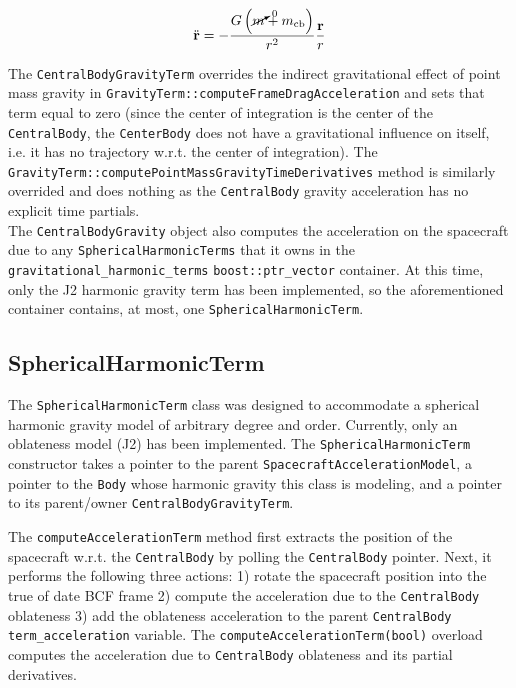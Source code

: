 \begin{equation}
\ddot{\mathbf{r}} = -\frac{G \left(\cancelto{0}{m} + m_{\text{cb}}\right)}{r^2}\frac{\mathbf{r}}{r} \label{eq:EOM_central_body_gravity}
\end{equation}

The \texttt{CentralBodyGravityTerm} overrides the indirect gravitational effect of point mass gravity in \texttt{GravityTerm::computeFrameDragAcceleration} and sets that term equal to zero (since the center of integration is the center of the \texttt{CentralBody}, the \texttt{CenterBody} does not have a gravitational influence on itself, i.e. it has no trajectory w.r.t. the center of integration). The \texttt{GravityTerm::computePointMassGravityTimeDerivatives} method is similarly overrided and does nothing as the \texttt{CentralBody} gravity acceleration has no explicit time partials. \\

The \texttt{CentralBodyGravity} object also computes the acceleration on the spacecraft due to any \texttt{SphericalHarmonicTerms} that it owns in the \texttt{gravitational\_harmonic\_terms} \texttt{boost::ptr\_vector} container. At this time, only the J2 harmonic gravity term has been implemented, so the aforementioned container contains, at most, one \texttt{SphericalHarmonicTerm}.

\subsection{SphericalHarmonicTerm}
\label{sec:SphericalHarmonicTerm}
The \texttt{SphericalHarmonicTerm} class was designed to accommodate a spherical harmonic gravity model of arbitrary degree and order. Currently, only an oblateness model (J2) has been implemented. The \texttt{SphericalHarmonicTerm} constructor takes a pointer to the parent \texttt{SpacecraftAccelerationModel}, a pointer to the \texttt{Body} whose harmonic gravity this class is modeling, and a pointer to its parent/owner \texttt{CentralBodyGravityTerm}.

The \texttt{computeAccelerationTerm} method first extracts the position of the spacecraft w.r.t. the \texttt{CentralBody} by polling the \texttt{CentralBody} pointer. Next, it performs the following three actions: 1) rotate the spacecraft position into the true of date BCF frame 2) compute the acceleration due to the \texttt{CentralBody} oblateness 3) add the oblateness acceleration to the parent \texttt{CentralBody} \texttt{term\_acceleration} variable. The \texttt{computeAccelerationTerm(bool)} overload computes the acceleration due to \texttt{CentralBody} oblateness and its partial derivatives.

